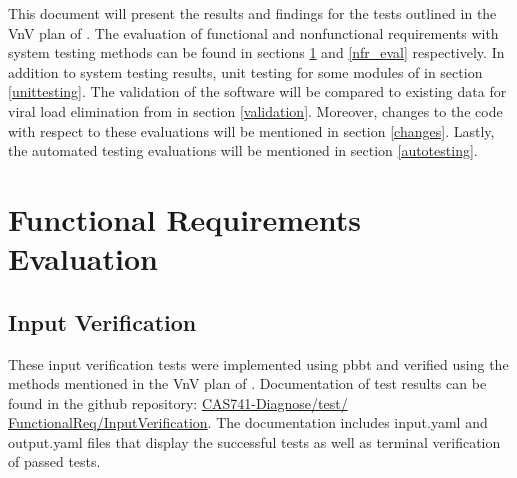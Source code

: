 \documentclass[12pt, titlepage]{article}
\begin{document}
\newpage

\tableofcontents
\newpage
\listoftables %
\newpage
\listoffigures %
\newpage

\newpage


This document will present the results and findings for the tests outlined in 
the VnV plan of \progname{} \citep{DiagnoseVNVplan}. The evaluation of 
functional and nonfunctional requirements with system testing methods can be 
found in 
sections \ref{fr_eval} and \ref{nfr_eval} respectively. In addition to system 
testing results, unit testing for some modules of \progname{} in section 
\ref{unittesting}. The validation of the \progname{} software
will be compared to existing data for viral load elimination from 
\citet{Stafford2000} in section \ref{validation}. Moreover, changes to the code 
with respect to these evaluations will be mentioned in section \ref{changes}. 
Lastly, the automated testing evaluations will be mentioned in section 
\ref{autotesting}.


\section{Functional Requirements Evaluation}\label{fr_eval}

\subsection{Input Verification}

These input verification tests were implemented using pbbt and verified using the methods mentioned in the VnV plan of \progname{}. Documentation of test results can be found in the 
github repository: 
\href{https://github.com/andreamclemeno/CAS741-Diagnose/tree/master/test/FunctionalReq/OutputCorrectness}{CAS741-Diagnose/test/ FunctionalReq/InputVerification}. The documentation includes input.yaml and output.yaml files that display the successful tests as well as terminal verification of passed tests.
\end{document}

